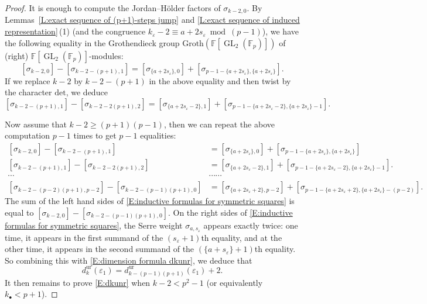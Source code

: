 \documentclass[12pt]{amsart}
\theoremstyle{definition}
\numberwithin{equation}{subsection}
\def\FF{\mathbb{F}}
\DeclareMathOperator{\GL}{GL}
\renewcommand{\det}{\mathrm{det}}
\newcommand{\unr}{\mathrm{ur}}
\begin{document}
\begin{proof}It is enough to compute the Jordan--H\"older factors of $\sigma_{k-2,0}$.
By Lemmas~\ref{L:exact sequence of (p+1)-steps jump} and \ref{L:exact sequence of induced representation}\,(1) (and the congruence $k_\varepsilon-2 \equiv a+2s_\varepsilon \bmod{(p-1)}$), we have the following equality in the Grothendieck group  $\mathrm{Groth}(\FF[\GL_2(\FF_p)])$ of (right) $\FF[\GL_2(\FF_p)]$-modules:
$$
[\sigma_{k-2,0}]-[\sigma_{k-2-(p+1), 1}]=[\sigma_{\{a+2s_\varepsilon\},0}]+[\sigma_{p-1-\{a+2s_\varepsilon\}, \{a+2s_\varepsilon\}}].
$$
If we replace $k-2$ by $k-2-(p+1)$ in the above equality and then twist by the character $\det$, we deduce 
$$
[\sigma_{k-2-(p+1), 1}]-[\sigma_{k-2-2(p+1), 2}]=[\sigma_{\{a+2s_\varepsilon-2\},1}]+[\sigma_{p-1-\{a+2s_\varepsilon-2\}, \{a+2s_\varepsilon\}-1}].
$$
		
Now assume that $k-2\geq (p+1)(p-1)$, then we can repeat the above		computation $p-1$ times to get $p-1$ equalities:
\begin{align}
\label{E:inductive formulas for symmetric squares}
[\sigma_{k-2,0}]-[\sigma_{k-2-(p+1), 1}]&=[\sigma_{\{a+2s_\varepsilon\},0}]+[\sigma_{p-1-\{a+2s_\varepsilon\}, \{a+2s_\varepsilon\}}]
\\
\nonumber
[\sigma_{k-2-(p+1), 1}]-[\sigma_{k-2-2(p+1), 2}] &=[\sigma_{\{a+2s_\varepsilon-2\},1}]+[\sigma_{p-1-\{a+2s_\varepsilon-2\}, \{a+2s_\varepsilon\}-1}].
\\
\nonumber
\cdots & \cdots\cdots\\
\nonumber
[\sigma_{k-2-(p-2)(p+1), p-2}]-[\sigma_{k-2-(p-1)(p+1), 0}]&=[\sigma_{\{a+2s_\varepsilon+2\},p-2}]+[\sigma_{p-1-\{a+2s_\varepsilon+2\}, \{a+2s_\varepsilon\}-(p-2)}].
\end{align}
The sum of the left hand sides of \eqref{E:inductive formulas for symmetric squares} is equal to $[\sigma_{k-2,0}] - [\sigma_{k-2-(p-1)(p+1), 0}]$.
On the right sides of \eqref{E:inductive formulas for symmetric squares}, the Serre weight $\sigma_{a, s_\varepsilon}$ appears exactly twice: one time, it appears in the first summand of the $(s_\varepsilon+1)$th equality, and at the other time, it appears in the second summand of the $(\{a+s_\varepsilon\}+1)$th equality. So combining this with \eqref{E:dimension formula dkunr}, we deduce that $$d_k^{\unr}(\varepsilon_1)=d_{k-(p-1)(p+1)}^{\unr}(\varepsilon_1)+2.$$
It then remains to prove \eqref{E:dkunr} when $k-2< p^2-1$ (or equivalently $k_\bullet < p+1$).


\end{proof}
\end{document}
